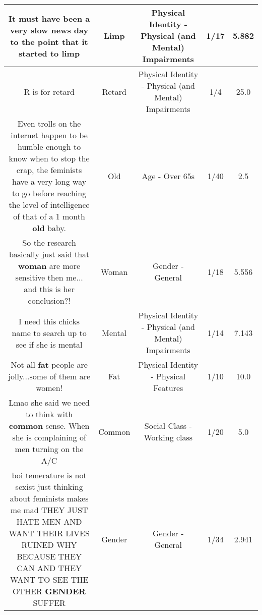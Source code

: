 \documentclass[11pt]{article}
\newlength\mylength
\begin{document}
\begin{center}
\begin{longtable}{|C{.65\mylength}|C{.30\mylength}|C{.12\mylength}|C{.12\mylength}|C{.12\mylength}|}
  \small It must have been a very slow news day to the point that it started to limp\normalsize   & Limp & Physical Identity - Physical (and Mental) Impairments & 1/17 & 5.882 \\  \hline
  \small R is for retard\normalsize   & Retard & Physical Identity - Physical (and Mental) Impairments & 1/4 & 25.0 \\  \hline
  \small Even trolls on the internet happen to be humble enough to know when to stop the crap, the feminists have a very long way to go before reaching the level of intelligence of that of a 1 month \textbf{old} baby.\normalsize   & Old & Age - Over 65s & 1/40 & 2.5 \\  \hline
  \small So the research basically just said that \textbf{woman} are more sensitive then me... and this is her conclusion?!\normalsize   & Woman & Gender - General & 1/18 & 5.556 \\  \hline
  \small I need this chicks name to search up to see if she is mental\normalsize   & Mental & Physical Identity - Physical (and Mental) Impairments & 1/14 & 7.143 \\  \hline
  \small Not all \textbf{fat} people are jolly...some of them are women!\normalsize   & Fat & Physical Identity - Physical Features & 1/10 & 10.0 \\  \hline
  \small Lmao she said we need to think with \textbf{common} sense. When she is complaining of men turning on the A/C\normalsize   & Common & Social Class - Working class & 1/20 & 5.0 \\  \hline
  \small boi temerature is not sexist just thinking about feminists makes me mad THEY JUST HATE MEN AND WANT THEIR LIVES RUINED WHY BECAUSE THEY CAN AND THEY WANT TO SEE THE OTHER \textbf{GENDER} SUFFER\normalsize   & Gender & Gender - General & 1/34 & 2.941 \\  \hline

\end{longtable}
\end{center}
\end{document}
